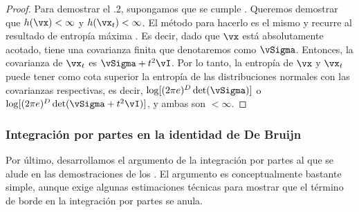 \documentclass[../../book-main_es.tex]{subfiles}
\begin{document}
\begin{proof}
    Para demostrar el .2, supongamos que
    se cumple . Queremos
    demostrar que \(h(\vx) < \infty\) y \(h(\vx_{t}) < \infty\). El
    método para hacerlo es el mismo y recurre al resultado de entropía máxima
    . Es decir, dado que \(\vx\) está
    absolutamente acotado, tiene una covarianza finita que
    denotaremos como \(\vSigma\). Entonces, la covarianza de \(\vx_{t}\) es
    \(\vSigma + t^{2}\vI\). Por lo tanto, la entropía de \(\vx\) y
    \(\vx_{t}\) puede tener como cota superior la entropía de las distribuciones normales
    con las covarianzas respectivas, es decir, \(\log[(2\pi
    e)^{D}\det(\vSigma)]\) o \(\log[(2\pi e)^{D}\det(\vSigma +
    t^{2}\vI)]\), y ambas son \(< \infty\).
\end{proof}

\subsubsection{Integración por partes en la identidad de De Bruijn}

Por último, desarrollamos el argumento de la integración por partes al que se alude en
las demostraciones de los
.
El argumento es conceptualmente bastante simple, aunque exige algunas
estimaciones técnicas para mostrar que el término de borde en la
integración por partes se anula.
\end{document}

